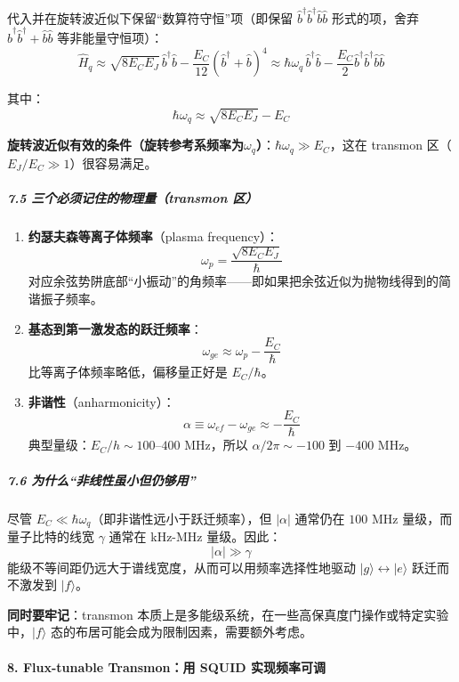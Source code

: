 \documentclass[12pt,a4paper,oneside]{ctexbook}
\let\oldparagraph\paragraph
\renewcommand{\paragraph}[1]{\oldparagraph{#1}\mbox{}}
\let\oldsubparagraph\subparagraph
\renewcommand{\subparagraph}[1]{\oldsubparagraph{#1}\mbox{}}
\begin{document}
代入并在旋转波近似下保留``数算符守恒''项（即保留
\(\hat b^\dagger\hat b^\dagger\hat b\hat b\) 形式的项，舍弃
\(\hat b^\dagger\hat b^\dagger + \hat b\hat b\) 等非能量守恒项）：
\[\hat H_q \approx \sqrt{8E_CE_J}\,\hat b^\dagger \hat b - \frac{E_C}{12}(\hat b^\dagger+\hat b)^4 \approx \hbar\omega_q\,\hat b^\dagger \hat b - \frac{E_C}{2}\hat b^\dagger\hat b^\dagger\hat b\hat b\]

其中： \[\hbar\omega_q \approx \sqrt{8E_CE_J} - E_C\]

\textbf{旋转波近似有效的条件（旋转参考系频率为$\omega_q$）}：\(\hbar\omega_q \gg E_C\)，这在 transmon
区（\(E_J/E_C \gg 1\)）很容易满足。

\subparagraph{7.5 三个必须记住的物理量（transmon
区）}\label{ux4e09ux4e2aux5fc5ux987bux8bb0ux4f4fux7684ux7269ux7406ux91cftransmon-ux533a}

\begin{enumerate}
\def\labelenumi{\arabic{enumi}.}
\item
  \textbf{约瑟夫森等离子体频率}（plasma frequency）：
  \[\omega_p = \frac{\sqrt{8E_CE_J}}{\hbar}\]
  对应余弦势阱底部``小振动''的角频率------即如果把余弦近似为抛物线得到的简谐振子频率。
\item
  \textbf{基态到第一激发态的跃迁频率}：
  \[\omega_{ge} \approx \omega_p - \frac{E_C}{\hbar}\]
  比等离子体频率略低，偏移量正好是 \(E_C/\hbar\)。
\item
  \textbf{非谐性}（anharmonicity）：
  \[\alpha \equiv \omega_{ef} - \omega_{ge} \approx -\frac{E_C}{\hbar}\]
  典型量级：\(E_C/h \sim 100\text{–}400\) MHz，所以
  \(\alpha/2\pi \sim -100\) 到 \(-400\) MHz。
\end{enumerate}

\subparagraph{7.6
为什么``非线性虽小但仍够用''}\label{ux4e3aux4ec0ux4e48ux975eux7ebfux6027ux867dux5c0fux4f46ux4ecdux591fux7528}

尽管 \(E_C \ll \hbar\omega_q\)（即非谐性远小于跃迁频率），但
\(|\alpha|\) 通常仍在 \(100\) MHz 量级，而量子比特的线宽 \(\gamma\)
通常在 kHz-MHz 量级。因此： \[|\alpha| \gg \gamma\]
能级不等间距仍远大于谱线宽度，从而可以用频率选择性地驱动
\(|g\rangle \leftrightarrow |e\rangle\) 跃迁而不激发到 \(|f\rangle\)。

\textbf{同时要牢记}：transmon
本质上是多能级系统，在一些高保真度门操作或特定实验中，\(|f\rangle\)
态的布居可能会成为限制因素，需要额外考虑。


\paragraph{8. Flux-tunable Transmon：用 SQUID
实现频率可调}\label{flux-tunable-transmonux7528-squid-ux5b9eux73b0ux9891ux7387ux53efux8c03}
\end{document}
